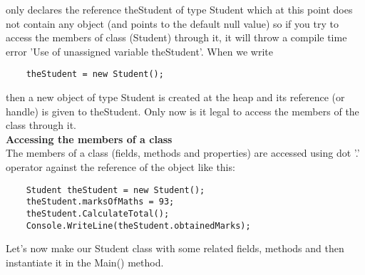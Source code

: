only declares the reference theStudent of type Student which at this point does not contain any object (and points to
the default null value) so if you try to access the members of class (Student) through it, it will throw a compile time
error ’Use of unassigned variable theStudent’. When we write

\begin{lstlisting}
    theStudent = new Student();    
\end{lstlisting}

then a new object of type Student is created at the heap and its reference (or handle) is given to theStudent. Only
now is it legal to access the members of the class through it.\\

\textbf{Accessing the members of a class}\\

The members of a class (fields, methods and properties) are accessed using dot ’.’ operator against the reference of
the object like this:

\begin{lstlisting}
    Student theStudent = new Student();
    theStudent.marksOfMaths = 93;
    theStudent.CalculateTotal();
    Console.WriteLine(theStudent.obtainedMarks);        
\end{lstlisting}

Let’s now make our Student class with some related fields, methods and then instantiate it in the Main() method.

